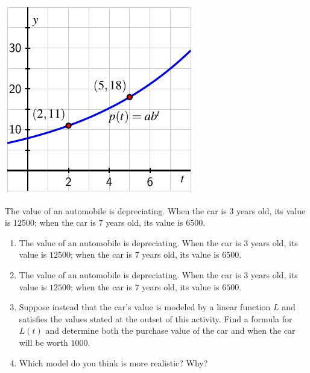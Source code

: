 \documentclass[nooutcomes]{ximera}
\begin{document}
\begin{example}
\begin{explanation}
\begin{image}
\includegraphics{growth-find-a-b}
\end{image}

\end{explanation}
\end{example}

\begin{exploration}
The value of an automobile is depreciating.  When the car is \(3\) years old, its value is \textdollar{}\(12500\); when the car is \(7\) years old, its value is \textdollar{}\(6500\).

\begin{enumerate}[label=\alph*.]
\item The value of an automobile is depreciating.  When the car is \(3\) years old, its value is \textdollar{}\(12500\); when the car is \(7\) years old, its value is \textdollar{}\(6500\).
\item The value of an automobile is depreciating.  When the car is \(3\) years old, its value is \textdollar{}\(12500\); when the car is \(7\) years old, its value is \textdollar{}\(6500\).
\item Suppose instead that the car's value is modeled by a linear function \(L\) and satisfies the values stated at the outset of this activity.  Find a formula for \(L(t)\) and determine both the purchase value of the car and when the car will be worth \textdollar{}\(1000\).
\item Which model do you think is more realistic?  Why?
\end{enumerate}
\end{exploration}

\end{document}
